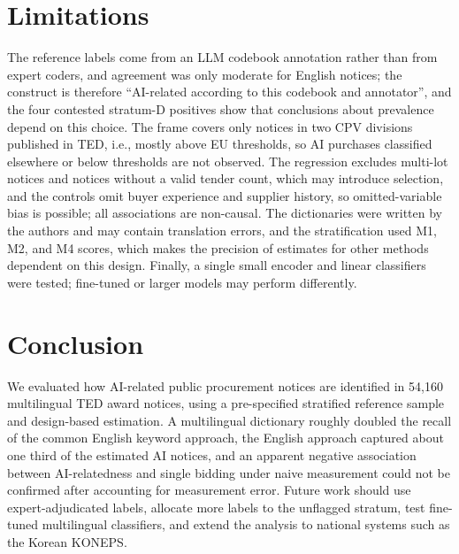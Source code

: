\section{Limitations}
The reference labels come from an LLM codebook annotation rather than from expert coders, and agreement was only moderate for English notices; the construct is therefore ``AI-related according to this codebook and annotator'', and the four contested stratum-D positives show that conclusions about prevalence depend on this choice. The frame covers only notices in two CPV divisions published in TED, i.e., mostly above EU thresholds, so AI purchases classified elsewhere or below thresholds are not observed. The regression excludes multi-lot notices and notices without a valid tender count, which may introduce selection, and the controls omit buyer experience and supplier history, so omitted-variable bias is possible; all associations are non-causal. The dictionaries were written by the authors and may contain translation errors, and the stratification used M1, M2, and M4 scores, which makes the precision of estimates for other methods dependent on this design. Finally, a single small encoder and linear classifiers were tested; fine-tuned or larger models may perform differently.

\section{Conclusion}
We evaluated how AI-related public procurement notices are identified in 54,160 multilingual TED award notices, using a pre-specified stratified reference sample and design-based estimation. A multilingual dictionary roughly doubled the recall of the common English keyword approach, the English approach captured about one third of the estimated AI notices, and an apparent negative association between AI-relatedness and single bidding under naive measurement could not be confirmed after accounting for measurement error. Future work should use expert-adjudicated labels, allocate more labels to the unflagged stratum, test fine-tuned multilingual classifiers, and extend the analysis to national systems such as the Korean KONEPS.

